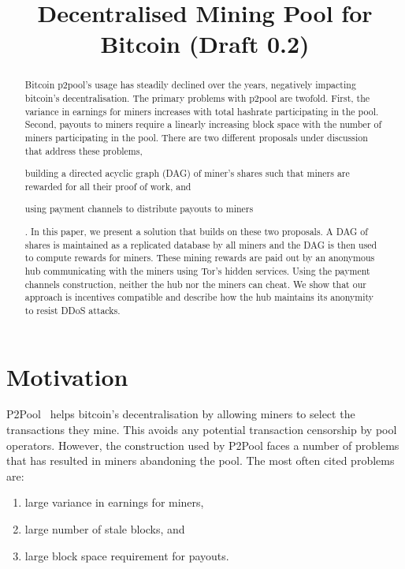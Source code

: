 \documentclass{article}
\title{Decentralised Mining Pool for Bitcoin (Draft 0.2)}
\author{}
\date{}
\begin{document}
\maketitle

\begin{abstract}
  Bitcoin p2pool's usage has steadily declined over the years,
  negatively impacting bitcoin's decentralisation. The primary
  problems with p2pool are twofold. First, the variance in earnings
  for miners increases with total hashrate participating in the
  pool. Second, payouts to miners require a linearly increasing block
  space with the number of miners participating in the pool. There are
  two different proposals under discussion that address these
  problems,
  \begin{enumerate*}[label=(\roman*)]
  \item building a directed acyclic graph (DAG) of miner's shares such
    that miners are rewarded for all their proof of work, and
  \item  using payment channels to distribute payouts to miners
  \end{enumerate*}. In this paper, we present a solution that builds
  on these two proposals. A DAG of shares is maintained as a
  replicated database by all miners and the DAG is then used to
  compute rewards for miners. These mining rewards are paid out by an
  anonymous hub communicating with the miners using Tor's hidden
  services. Using the payment channels construction, neither the hub
  nor the miners can cheat. We show that our approach is incentives
  compatible and describe how the hub maintains its anonymity to
  resist DDoS attacks.
\end{abstract}
   
\section{Motivation}

P2Pool~\cite{p2pool:wiki} helps bitcoin's decentralisation by allowing
miners to select the transactions they mine. This avoids any potential
transaction censorship by pool operators. However, the construction
used by P2Pool faces a number of problems that has resulted in miners
abandoning the pool. The most often cited problems are:

\begin{enumerate}
\item large variance in earnings for miners,
\item large number of stale blocks, and
\item large block space requirement for payouts.
\end{enumerate}
\end{document}

